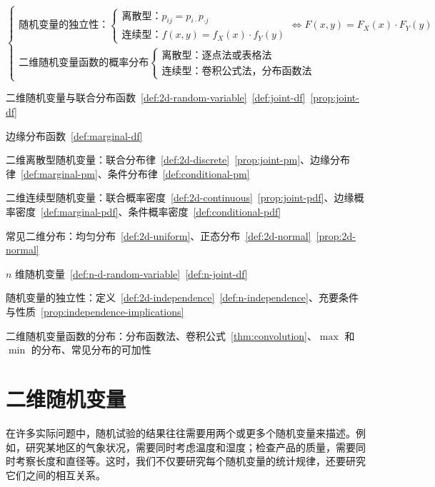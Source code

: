 \documentclass[lang=cn,11pt]{elegantbook}
\begin{document}
\[\begin{cases}
\text{随机变量的独立性：}
\begin{cases}
\text{离散型：} p_{ij}=p_{i\cdot}p_{\cdot j} \\
\text{连续型：} f(x,y)=f_X(x)\cdot f_Y(y)
\end{cases}
\iff F(x,y)=F_X(x)\cdot F_Y(y) \\[12pt]

\text{二维随机变量函数的概率分布}
\begin{cases}
\text{离散型：逐点法或表格法} \\
\text{连续型：卷积公式法，分布函数法}
\end{cases}
\end{cases}
\]

\begin{introduction}
  \item 二维随机变量与联合分布函数~\ref{def:2d-random-variable}~\ref{def:joint-df}~\ref{prop:joint-df}
  \item 边缘分布函数~\ref{def:marginal-df}
  \item 二维离散型随机变量：联合分布律~\ref{def:2d-discrete}~\ref{prop:joint-pm}、边缘分布律~\ref{def:marginal-pm}、条件分布律~\ref{def:conditional-pm}
  \item 二维连续型随机变量：联合概率密度~\ref{def:2d-continuous}~\ref{prop:joint-pdf}、边缘概率密度~\ref{def:marginal-pdf}、条件概率密度~\ref{def:conditional-pdf}
  \item 常见二维分布：均匀分布~\ref{def:2d-uniform}、正态分布~\ref{def:2d-normal}~\ref{prop:2d-normal}
  \item $n$ 维随机变量~\ref{def:n-d-random-variable}~\ref{def:n-joint-df}
  \item 随机变量的独立性：定义~\ref{def:2d-independence}~\ref{def:n-independence}、充要条件与性质~\ref{prop:independence-implications}
  \item 二维随机变量函数的分布：分布函数法、卷积公式~\ref{thm:convolution}、$\max$ 和 $\min$ 的分布、常见分布的可加性
\end{introduction}

\section{二维随机变量}

在许多实际问题中，随机试验的结果往往需要用两个或更多个随机变量来描述。例如，研究某地区的气象状况，需要同时考虑温度和湿度；检查产品的质量，需要同时考察长度和直径等。这时，我们不仅要研究每个随机变量的统计规律，还要研究它们之间的相互关系。
\end{document}
